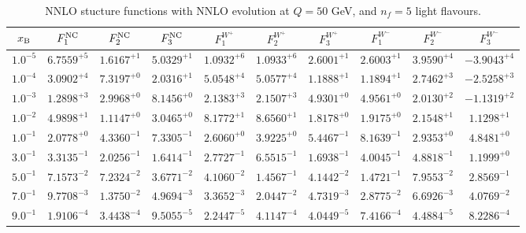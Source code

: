 \begin{table}[h]
\begin{adjustbox}{width=\textwidth}
\begin{tabular}{|c||c|c|c|c|c|c|c|c|c|}
\hline
$x_{\rm B}$ & $F_1^{\rm NC}$ & $F_2^{\rm NC}$ & $F_3^{\rm NC}$ & $F_1^{W^+}$ & $F_2^{W^+}$ & $F_3^{W^+}$ & $F_1^{W^-}$ & $F_2^{W^-}$ & $F_3^{W^-}$ \\
\hline
$ 1.0^{-5}$ & $ 6.7559^{+5}$ & $ 1.6167^{+1}$ & $ 5.0329^{+1}$ & $ 1.0932^{+6}$ & $ 1.0933^{+6}$ & $ 2.6001^{+1}$ & $ 2.6003^{+1}$ & $ 3.9590^{+4}$ & $-3.9043^{+4}$ \\
$ 1.0^{-4}$ & $ 3.0902^{+4}$ & $ 7.3197^{+0}$ & $ 2.0316^{+1}$ & $ 5.0548^{+4}$ & $ 5.0577^{+4}$ & $ 1.1888^{+1}$ & $ 1.1894^{+1}$ & $ 2.7462^{+3}$ & $-2.5258^{+3}$ \\
$ 1.0^{-3}$ & $ 1.2898^{+3}$ & $ 2.9968^{+0}$ & $ 8.1456^{+0}$ & $ 2.1383^{+3}$ & $ 2.1507^{+3}$ & $ 4.9301^{+0}$ & $ 4.9561^{+0}$ & $ 2.0130^{+2}$ & $-1.1319^{+2}$ \\
$ 1.0^{-2}$ & $ 4.9898^{+1}$ & $ 1.1147^{+0}$ & $ 3.0465^{+0}$ & $ 8.1772^{+1}$ & $ 8.6560^{+1}$ & $ 1.8178^{+0}$ & $ 1.9175^{+0}$ & $ 2.1548^{+1}$ & $ 1.1298^{+1}$ \\
$ 1.0^{-1}$ & $ 2.0778^{+0}$ & $ 4.3360^{-1}$ & $ 7.3305^{-1}$ & $ 2.6060^{+0}$ & $ 3.9225^{+0}$ & $ 5.4467^{-1}$ & $ 8.1639^{-1}$ & $ 2.9353^{+0}$ & $ 4.8481^{+0}$ \\
$ 3.0^{-1}$ & $ 3.3135^{-1}$ & $ 2.0256^{-1}$ & $ 1.6414^{-1}$ & $ 2.7727^{-1}$ & $ 6.5515^{-1}$ & $ 1.6938^{-1}$ & $ 4.0045^{-1}$ & $ 4.8818^{-1}$ & $ 1.1999^{+0}$ \\
$ 5.0^{-1}$ & $ 7.1573^{-2}$ & $ 7.2324^{-2}$ & $ 3.6771^{-2}$ & $ 4.1060^{-2}$ & $ 1.4567^{-1}$ & $ 4.1442^{-2}$ & $ 1.4721^{-1}$ & $ 7.9553^{-2}$ & $ 2.8569^{-1}$ \\
$ 7.0^{-1}$ & $ 9.7708^{-3}$ & $ 1.3750^{-2}$ & $ 4.9694^{-3}$ & $ 3.3652^{-3}$ & $ 2.0447^{-2}$ & $ 4.7319^{-3}$ & $ 2.8775^{-2}$ & $ 6.6926^{-3}$ & $ 4.0769^{-2}$ \\
$ 9.0^{-1}$ & $ 1.9106^{-4}$ & $ 3.4438^{-4}$ & $ 9.5055^{-5}$ & $ 2.2447^{-5}$ & $ 4.1147^{-4}$ & $ 4.0449^{-5}$ & $ 7.4166^{-4}$ & $ 4.4884^{-5}$ & $ 8.2286^{-4}$ \\
\hline
\end{tabular}
\end{adjustbox}\caption{NNLO stucture functions with NNLO evolution at $Q = 50$ GeV, and $n_f=5$ light flavours.}
\label{tab:N2LO-Q50}
\end{table}


